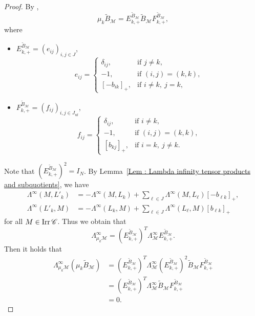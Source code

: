 \begin{proof}
By \cite[(3.2)]{BFZ05},
\[
\mu_k\widetilde{B}_{\mathcal{M}}
= E_{k,+}^{\widetilde{B}_{\mathcal{M}}}
\widetilde{B}_{\mathcal{M}}
F_{k,+}^{\widetilde{B}_{\mathcal{M}}},
\]
where
\begin{itemize}
    \item
    $E_{k,+}^{\widetilde{B}_{\mathcal{M}}} = (e_{ij})_{i,j \in J}$,
    \[
    e_{ij} =
    \begin{cases}
        \delta_{ij}, & \text{if }j \neq k, \\
        -1, & \text{if }(i, j) = (k, k), \\
        [-b_{ik}]_+, & \text{if }i \neq k,\ j = k,
    \end{cases}
    \]
    \item
    $F_{k,+}^{\widetilde{B}_{\mathcal{M}}}
    = (f_{ij})_{i,j \in J_{\mathrm{uf}}}$,
    \[
    f_{ij} =
    \begin{cases}
        \delta_{ij}, & \text{if }i \neq k, \\
        -1, & \text{if }(i, j) = (k, k), \\
        [b_{kj}]_+, & \text{if }i = k,\ j \neq k.
    \end{cases}
    \]
\end{itemize}
Note that
$\left(E_{k,+}^{\widetilde{B}_{\mathcal{M}}}\right)^2 = I_N$.
By Lemma~\ref{Lem : Lambda infinity tensor products and subquotients},
we have
\[
\begin{aligned}
\Lambda^{\infty}(M, L'_k)
&= -\Lambda^{\infty}(M, L_k)
+ \sum_{\ell \in J}\Lambda^{\infty}(M, L_\ell)[-b_{\ell k}]_+, \\
\Lambda^{\infty}(L'_k, M)
&= -\Lambda^{\infty}(L_k, M)
+ \sum_{\ell \in J}\Lambda^{\infty}(L_\ell, M)[b_{\ell k}]_+
\end{aligned}
\]
for all $M \in \mathop{\mathrm{Irr}}\nolimits\mathscr{C}$.
Thus we obtain that
\[
\Lambda^{\infty}_{\mu_k\mathcal{M}}
= \left(E_{k,+}^{\widetilde{B}_{\mathcal{M}}}\right)^T
\Lambda^{\infty}_{\mathcal{M}}
E_{k,+}^{\widetilde{B}_{\mathcal{M}}}.
\]
Then it holds that
\[
\begin{aligned}
\Lambda^{\infty}_{\mu_k\mathcal{M}}
(\mu_k\widetilde{B}_{\mathcal{M}})
&= \left(E_{k,+}^{\widetilde{B}_{\mathcal{M}}}\right)^T
\Lambda^{\infty}_{\mathcal{M}}
\left(E_{k,+}^{\widetilde{B}_{\mathcal{M}}}\right)^2
\widetilde{B}_{\mathcal{M}}
F_{k,+}^{\widetilde{B}_{\mathcal{M}}} \\
&= \left(E_{k,+}^{\widetilde{B}_{\mathcal{M}}}\right)^T
\Lambda^{\infty}_{\mathcal{M}}\widetilde{B}_{\mathcal{M}}
F_{k,+}^{\widetilde{B}_{\mathcal{M}}} \\
&= 0.
\end{aligned}
\]
\end{proof}

